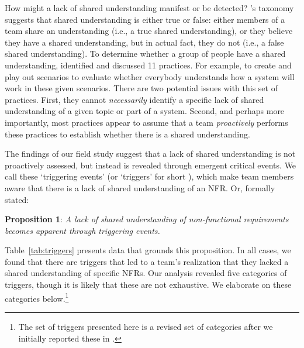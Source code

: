\documentclass[smallextended]{svjour3}
\newcommand\cwproposition[2]{
\normalsize 
\vspace{0.5em}%
\noindent \textbf{\sffamily\fontsize{9}{11}\selectfont Proposition #1}: \textit{#2}
\vspace{0.5em}
}
\begin{document}
How might a lack of shared understanding manifest or be detected?
\cite{glinz_shared_2015}'s taxonomy suggests that shared understanding is either true or false: either members of a team share an understanding (i.e., a true shared understanding), or they believe they have a shared understanding, but in actual fact, they do not (i.e., a false shared understanding). 
To determine whether a group of people have a shared understanding, \cite{glinz_shared_2015} identified and discussed 11 practices. For example, to create and play out scenarios to evaluate whether everybody understands how a system will work in these given scenarios. 
There are two potential issues with this set of practices. First, they cannot \textit{necessarily} identify a \textmd{specific} lack of shared understanding of a given topic or part of a system. Second, and perhaps more importantly, most practices appear to assume that a team \textit{proactively} performs these practices to establish whether there is a shared understanding. 

The findings of our field study suggest that a lack of shared understanding is not proactively assessed, but instead is revealed through emergent critical events. 
We call these `triggering events' (or `triggers' for short \citep{werner2020re}), which make team members aware that there is a lack of shared understanding of an NFR. Or, formally stated:

\cwproposition{1}{A lack of shared understanding of non-functional requirements becomes apparent through triggering events.}

Table~\ref{tab:triggers} presents data that grounds this proposition. In all cases, we found that there are triggers that led to a team's realization that they lacked a shared understanding of specific NFRs. 
Our analysis revealed five categories of triggers, though it is likely that these are not exhaustive. We elaborate on these categories below.\footnote{The set of triggers presented here is a revised set of categories after we initially reported these in \cite{werner2020re}.}
\end{document}
